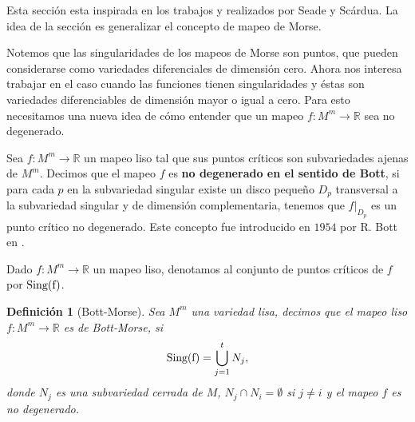 \documentclass[a4paper,10pt]{book}
\newtheorem{definicion}{Definici\'on}[chapter]
\begin{document}
Esta secci\'on esta inspirada en los trabajos \cite{Seade1} y \cite{Seade2} realizados por Seade y Sc\'ardua. La idea de la secci\'on es generalizar el concepto de mapeo de Morse.
\vspace{5mm}

Notemos que las singularidades de los mapeos de Morse son puntos, que pueden considerarse como variedades diferenciales de dimensi\'on cero. Ahora nos interesa trabajar en el caso cuando las funciones tienen singularidades y \'estas son variedades diferenciables de dimensi\'on mayor o igual a cero. Para esto necesitamos una nueva idea de c\'omo entender que un mapeo $f:M^{m}\to\mathbb{R}$ sea no degenerado.
\vspace{5mm}

Sea $f:M^{m}\to\mathbb{R}$ un mapeo liso tal que sus puntos cr\'iticos son subvariedades ajenas de $M^{m}$. Decimos que el mapeo 
$f$ es {\bfseries no degenerado en el sentido de Bott}, si para cada $p$ en la subvariedad singular existe un disco peque\~{n}o $D_{p}$ transversal a la subvariedad singular y de dimensi\'on complementaria, tenemos que $f|_{D_{p}}$ es un punto cr\'itico no degenerado. Este concepto fue introducido en $1954$ por R. Bott en \cite{Bott}.
\vspace{5mm}

Dado $f:M^{m}\to\mathbb{R}$ un mapeo liso, denotamos al conjunto de puntos cr\'iticos de $f$ por ${\rm Sing(f)}$. 

\begin{definicion}[Bott-Morse]\label{DefBM}
Sea $M^{m}$ una variedad lisa, decimos que el mapeo liso $f:M^{m}\to\mathbb{R}$ es de Bott-Morse, si
$${\rm Sing(f)}=\bigcup_{j=1}^{t}N_{j},$$
donde $N_{j}$ es una subvariedad cerrada de $M$, $N_{j}\cap N_{i}=\emptyset$ si $j\neq i$ y el mapeo $f$ es no degenerado. 
\end{definicion}
\end{document}

